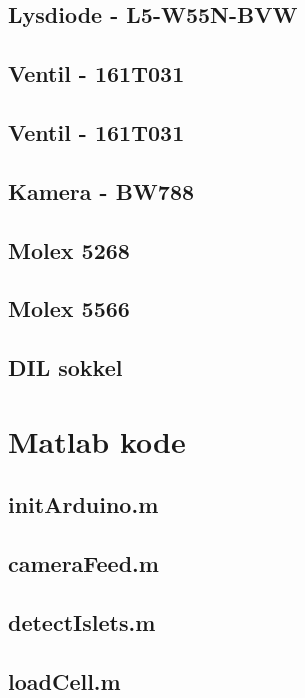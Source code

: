 \subsection{Lysdiode - L5-W55N-BVW}
\label{bilag:L5-W55N-BVW}

\subsection{Ventil - 161T031}
\label{bilag:ventil}

\subsection{Ventil - 161T031}
\label{bilag:ventil}

\subsection{Kamera - BW788}

\subsection{Molex 5268}

\subsection{Molex 5566}


\subsection{DIL sokkel}

\section{Matlab kode}
\subsection{initArduino.m} 
\label{bilag:initArduino}
\subsection{cameraFeed.m} 
\label{bilag:cameraFeed}
\subsection{detectIslets.m}
\subsection{loadCell.m}
\newpage
